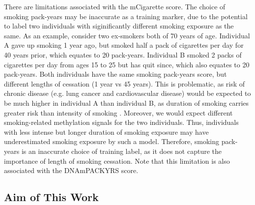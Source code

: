 \documentclass{article}
\begin{document}
There are limitations associated with the mCigarette score. The choice of smoking pack-years may be inaccurate as a training marker, due to the potential to label two individuals with siginificantly different smoking exposure as the same. As an example, consider two ex-smokers both of 70 years of age. Individual A gave up smoking 1 year ago, but smoked half a pack of cigarettes per day for 40 years prior, which equates to 20 pack-years. Individual B smoked 2 packs of cigarettes per day from ages 15 to 25 but has quit since, which also equates to 20 pack-years. Both individuals have the same smoking pack-years score, but different lengths of cessation (1 year vs 45 years). This is problematic, as risk of chronic disease (e.g. lung cancer and cardiovascular disease) would be expected to be much higher in individual A than individual B, as duration of smoking carries greater risk than intensity of smoking \cite{potter2024pack}. Moreover, we would expect different smoking-related methylation signals for the two individuals. Thus, individuals with less intense but longer duration of smoking exposure may have underestimated smoking exposure by such a model. Therefore, smoking pack-years is an inaccurate choice of training label, as it does not capture the importance of length of smoking cessation. Note that this limitation is also associated with the DNAmPACKYRS score.


\subsection{Aim of This Work}
\end{document}
